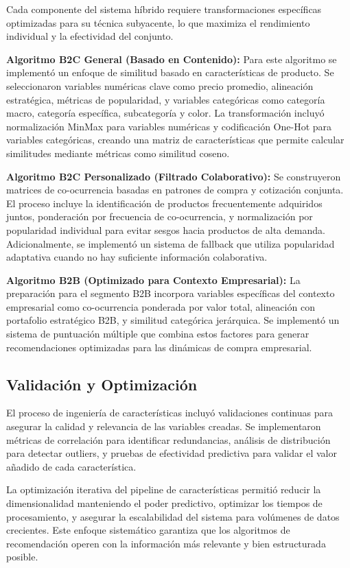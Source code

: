 \documentclass[twocolumn]{article}
\begin{document}
Cada componente del sistema híbrido requiere transformaciones específicas optimizadas para su técnica subyacente, lo que maximiza el rendimiento individual y la efectividad del conjunto.

\textbf{Algoritmo B2C General (Basado en Contenido):}
Para este algoritmo se implementó un enfoque de similitud basado en características de producto. Se seleccionaron variables numéricas clave como precio promedio, alineación estratégica, métricas de popularidad, y variables categóricas como categoría macro, categoría específica, subcategoría y color. La transformación incluyó normalización MinMax para variables numéricas y codificación One-Hot para variables categóricas, creando una matriz de características que permite calcular similitudes mediante métricas como similitud coseno.

\textbf{Algoritmo B2C Personalizado (Filtrado Colaborativo):}
Se construyeron matrices de co-ocurrencia basadas en patrones de compra y cotización conjunta. El proceso incluye la identificación de productos frecuentemente adquiridos juntos, ponderación por frecuencia de co-ocurrencia, y normalización por popularidad individual para evitar sesgos hacia productos de alta demanda. Adicionalmente, se implementó un sistema de fallback que utiliza popularidad adaptativa cuando no hay suficiente información colaborativa.

\textbf{Algoritmo B2B (Optimizado para Contexto Empresarial):}
La preparación para el segmento B2B incorpora variables específicas del contexto empresarial como co-ocurrencia ponderada por valor total, alineación con portafolio estratégico B2B, y similitud categórica jerárquica. Se implementó un sistema de puntuación múltiple que combina estos factores para generar recomendaciones optimizadas para las dinámicas de compra empresarial.

\subsection{Validación y Optimización}

El proceso de ingeniería de características incluyó validaciones continuas para asegurar la calidad y relevancia de las variables creadas. Se implementaron métricas de correlación para identificar redundancias, análisis de distribución para detectar outliers, y pruebas de efectividad predictiva para validar el valor añadido de cada característica.

La optimización iterativa del pipeline de características permitió reducir la dimensionalidad manteniendo el poder predictivo, optimizar los tiempos de procesamiento, y asegurar la escalabilidad del sistema para volúmenes de datos crecientes. Este enfoque sistemático garantiza que los algoritmos de recomendación operen con la información más relevante y bien estructurada posible.
\end{document}
